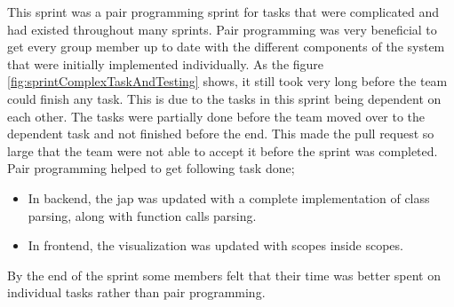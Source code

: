This \gls{sprint} was a pair programming \gls{sprint} for tasks that were complicated and had existed throughout many \glspl{sprint}. Pair programming was very beneficial to get every group member up to date with the different components of the system that were initially implemented individually.
As the figure \ref{fig:sprintComplexTaskAndTesting} shows, it still took very long before the team could finish any task. This is due to the tasks in this \gls{sprint} being dependent on each other. The tasks were partially done before the team moved over to the dependent task and not finished before the end.
This made the pull request so large that the team were not able to accept it before the \gls{sprint} was completed.
Pair programming helped to get following task done;
\begin{itemize}
    \item In \gls{backend}, the \gls{jap} was updated with a complete implementation of class parsing, along with function calls parsing. 
    \item In \gls{frontend}, the visualization was updated with scopes inside scopes.
\end{itemize}

By the end of the \gls{sprint} some members felt that their time was better spent on individual tasks rather than pair programming.